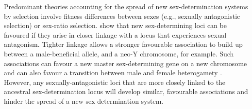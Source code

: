 \documentclass[12pt]{article}
\begin{document}


Predominant theories accounting for the spread of new sex-determination systems by selection involve fitness differences between sexes (e.g., sexually antagonistic selection) or sex-ratio selection. 
\citet{vanDoorn:2007eu,vanDoorn:2010hu} show that new sex-determining loci can be favoured if they arise in closer linkage with a locus that experiences sexual antagonism. 
Tighter linkage allows a stronger favourable association to build up between a male-beneficial allele, and a neo-Y chromosome, for example. 
Such associations can favour a new master sex-determining gene on a new chromosome \citep{vanDoorn:2007eu} and can also favour a transition between male and female heterogamety \citep[e.g., a ZW to XY transition,][]{vanDoorn:2010hu}. 
However, any sexually-antagonistic loci that are more closely linked to the ancestral sex-determination locus will develop similar, favourable associations and hinder the spread of a new sex-determination system. 
\end{document}
